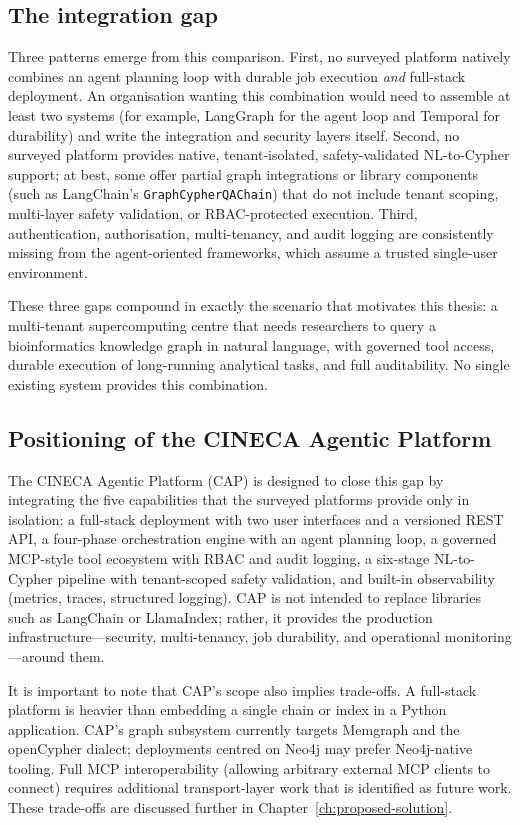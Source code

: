 \documentclass[a4paper,noexaminfo]{sapthesis}
\begin{document}
\subsection{The integration gap}

Three patterns emerge from this comparison.  First, no surveyed platform
natively combines an agent planning loop with durable job execution
\emph{and} full-stack deployment.  An organisation wanting this combination
would need to assemble at least two systems (for example, LangGraph for the
agent loop and Temporal for durability) and write the integration and
security layers itself.  Second, no surveyed platform provides native,
tenant-isolated, safety-validated NL-to-Cypher support; at best, some offer
partial graph integrations or library components (such as LangChain's
\texttt{GraphCypherQAChain}) that do not include tenant scoping, multi-layer
safety validation, or RBAC-protected execution.  Third, authentication,
authorisation, multi-tenancy, and audit logging are consistently missing
from the agent-oriented frameworks, which assume a trusted single-user
environment.

These three gaps compound in exactly the scenario that motivates this thesis:
a multi-tenant supercomputing centre that needs researchers to query a
bioinformatics knowledge graph in natural language, with governed tool
access, durable execution of long-running analytical tasks, and full
auditability.  No single existing system provides this combination.

\subsection{Positioning of the CINECA Agentic Platform}

The CINECA Agentic Platform (CAP) is designed to close this gap by
integrating the five capabilities that the surveyed platforms provide only
in isolation: a full-stack deployment with two user interfaces and a
versioned REST API, a four-phase orchestration engine with an agent
planning loop, a governed MCP-style tool ecosystem with RBAC and audit
logging, a six-stage NL-to-Cypher pipeline with tenant-scoped safety
validation, and built-in observability (metrics, traces, structured
logging).  CAP is not intended to replace libraries such as LangChain or
LlamaIndex; rather, it provides the production infrastructure---security,
multi-tenancy, job durability, and operational monitoring---around them.

It is important to note that CAP's scope also implies trade-offs.  A
full-stack platform is heavier than embedding a single chain or index in a
Python application.  CAP's graph subsystem currently targets Memgraph and
the openCypher dialect; deployments centred on Neo4j may prefer Neo4j-native
tooling.  Full MCP interoperability (allowing arbitrary external MCP clients
to connect) requires additional transport-layer work that is identified as
future work.  These trade-offs are discussed further in
Chapter~\ref{ch:proposed-solution}.
\end{document}
